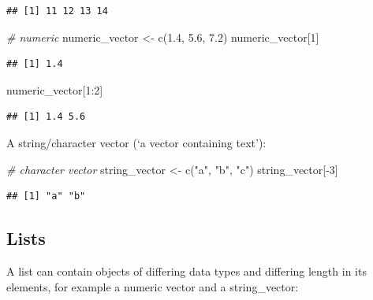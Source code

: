 \documentclass[
  12pt,
]{style/krantz}
\newenvironment{Shaded}{\begin{snugshade}}{\end{snugshade}}
\newcommand{\CommentTok}[1]{\textcolor[rgb]{0.56,0.35,0.01}{\textit{#1}}}
\newcommand{\DecValTok}[1]{\textcolor[rgb]{0.00,0.00,0.81}{#1}}
\newcommand{\FloatTok}[1]{\textcolor[rgb]{0.00,0.00,0.81}{#1}}
\newcommand{\FunctionTok}[1]{\textcolor[rgb]{0.00,0.00,0.00}{#1}}
\newcommand{\NormalTok}[1]{#1}
\newcommand{\OtherTok}[1]{\textcolor[rgb]{0.56,0.35,0.01}{#1}}
\newcommand{\SpecialCharTok}[1]{\textcolor[rgb]{0.00,0.00,0.00}{#1}}
\newcommand{\StringTok}[1]{\textcolor[rgb]{0.31,0.60,0.02}{#1}}
\begin{document}
\begin{verbatim}
## [1] 11 12 13 14
\end{verbatim}

\begin{Shaded}
\begin{Highlighting}[]
\CommentTok{\# numeric}
\NormalTok{numeric\_vector }\OtherTok{\textless{}{-}} \FunctionTok{c}\NormalTok{(}\FloatTok{1.4}\NormalTok{, }\FloatTok{5.6}\NormalTok{, }\FloatTok{7.2}\NormalTok{)}
\NormalTok{numeric\_vector[}\DecValTok{1}\NormalTok{]}
\end{Highlighting}
\end{Shaded}

\begin{verbatim}
## [1] 1.4
\end{verbatim}

\begin{Shaded}
\begin{Highlighting}[]
\NormalTok{numeric\_vector[}\DecValTok{1}\SpecialCharTok{:}\DecValTok{2}\NormalTok{]}
\end{Highlighting}
\end{Shaded}

\begin{verbatim}
## [1] 1.4 5.6
\end{verbatim}

A string/character vector (`a vector containing text'):

\begin{Shaded}
\begin{Highlighting}[]
\CommentTok{\# character vector}
\NormalTok{string\_vector }\OtherTok{\textless{}{-}} \FunctionTok{c}\NormalTok{(}\StringTok{"a"}\NormalTok{, }\StringTok{"b"}\NormalTok{, }\StringTok{"c"}\NormalTok{)}
\NormalTok{string\_vector[}\SpecialCharTok{{-}}\DecValTok{3}\NormalTok{]}
\end{Highlighting}
\end{Shaded}

\begin{verbatim}
## [1] "a" "b"
\end{verbatim}

\hypertarget{lists}{%
\subsection{Lists}\label{lists}}

A list can contain objects of differing data types and differing length in its elements, for example a numeric vector and a string\_vector:
\end{document}
